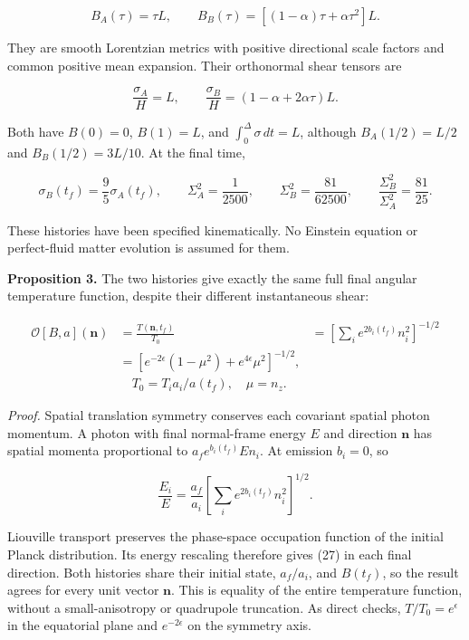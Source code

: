\documentclass[aps,prd,reprint,onecolumn,nofootinbib]{revtex4-2}
\begin{document}
\[
 B_A(\tau)=\tau L,\qquad
 B_B(\tau)=[(1-\alpha)\tau+\alpha\tau^2]L.
 \tag{24}
\]

They are smooth Lorentzian metrics with positive directional scale factors and common positive mean expansion. Their orthonormal shear tensors are

\[
 \frac{\sigma_A}{H}=L,\qquad
 \frac{\sigma_B}{H}=(1-\alpha+2\alpha\tau)L.
 \tag{25}
\]

Both have \(B(0)=0\), \(B(1)=L\), and \(\int_0^\Delta\sigma\,dt=L\), although \(B_A(1/2)=L/2\) and \(B_B(1/2)=3L/10\). At the final time,

\[
 \sigma_B(t_f)=\frac95\sigma_A(t_f),\qquad
 \Sigma_A^2=\frac1{2500},\qquad
 \Sigma_B^2=\frac{81}{62500},\qquad
 \frac{\Sigma_B^2}{\Sigma_A^2}=\frac{81}{25}.
 \tag{26}
\]

These histories have been specified kinematically. No Einstein equation or perfect-fluid matter evolution is assumed for them.

\textbf{Proposition 3.} The two histories give exactly the same full final angular temperature function, despite their different instantaneous shear:

\[
 \begin{aligned}\mathcal O[B,a](\boldsymbol n)
 &=\frac{T(\boldsymbol n,t_f)}{T_0}
 &=\left[\sum_i e^{2b_i(t_f)}n_i^2\right]^{-1/2}\\
 & =\left[e^{-2\epsilon}(1-\mu^2)+e^{4\epsilon}\mu^2\right]^{-1/2},\\
 &\quad T_0=T_i a_i/a(t_f),\quad \mu=n_z.
\end{aligned}\tag{27}
\]

\emph{Proof.} Spatial translation symmetry conserves each covariant spatial photon momentum. A photon with final normal-frame energy \(E\) and direction \(\boldsymbol n\) has spatial momenta proportional to \(a_f e^{b_i(t_f)}E n_i\). At emission \(b_i=0\), so

\[
 \frac{E_i}{E}=\frac{a_f}{a_i}
           \left[\sum_i e^{2b_i(t_f)}n_i^2\right]^{1/2}.
 \tag{28}
\]

Liouville transport preserves the phase-space occupation function of the initial Planck distribution. Its energy rescaling therefore gives (27) in each final direction. Both histories share their initial state, \(a_f/a_i\), and \(B(t_f)\), so the result agrees for every unit vector \(\boldsymbol n\). This is equality of the entire temperature function, without a small-anisotropy or quadrupole truncation. As direct checks, \(T/T_0=e^\epsilon\) in the equatorial plane and \(e^{-2\epsilon}\) on the symmetry axis.
\end{document}
